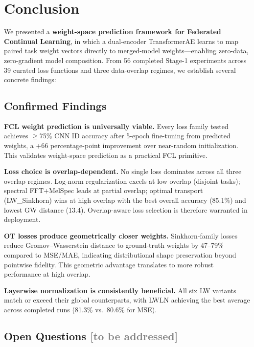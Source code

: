 \section{Conclusion}
\label{sec:conclusion}

We presented a \textbf{weight-space prediction framework for Federated Continual Learning}, in which a dual-encoder TransformerAE learns to map paired task weight vectors directly to merged-model weights---enabling zero-data, zero-gradient model composition. From 56 completed Stage-1 experiments across 39 curated loss functions and three data-overlap regimes, we establish several concrete findings:

\subsection{Confirmed Findings}

\textbf{FCL weight prediction is universally viable.} Every loss family tested achieves $\geq$75\% CNN ID accuracy after 5-epoch fine-tuning from predicted weights, a +66 percentage-point improvement over near-random initialization. This validates weight-space prediction as a practical FCL primitive.

\textbf{Loss choice is overlap-dependent.} No single loss dominates across all three overlap regimes. Log-norm regularization excels at low overlap (disjoint tasks); spectral FFT+MelSpec leads at partial overlap; optimal transport (LW\_Sinkhorn) wins at high overlap with the best overall accuracy (85.1\%) and lowest GW distance (13.4). Overlap-aware loss selection is therefore warranted in deployment.

\textbf{OT losses produce geometrically closer weights.} Sinkhorn-family losses reduce Gromov--Wasserstein distance to ground-truth weights by 47--79\% compared to MSE/MAE, indicating distributional shape preservation beyond pointwise fidelity. This geometric advantage translates to more robust performance at high overlap.

\textbf{Layerwise normalization is consistently beneficial.} All six LW variants match or exceed their global counterparts, with LWLN achieving the best average across completed runs (81.3\% vs.\ 80.6\% for MSE).

\subsection{Open Questions \textcolor{gray}{[to be addressed]}}

